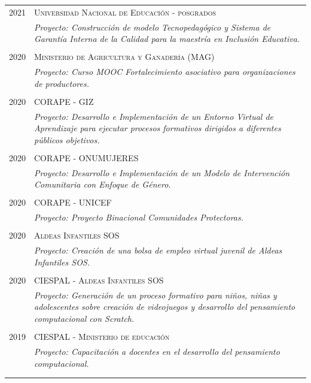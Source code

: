 \documentclass[a4paper]{article}
\begin{document}
\begin{longtable}{r|p{12cm}}
\textsc{2021} &  \textsc{Universidad Nacional de Educación - posgrados} \\&\emph{Proyecto: Construcción de modelo Tecnopedagógico y Sistema de Garantía Interna de la Calidad para la maestría en Inclusión Educativa.}\\\multicolumn{2}{c}{} \\

\textsc{2020} &  \textsc{Ministerio de Agricultura y Ganadería (MAG)} \\&\emph{Proyecto: Curso MOOC Fortalecimiento asociativo para organizaciones de productores.}\\\multicolumn{2}{c}{} \\

\textsc{2020} &  \textsc{CORAPE - GIZ}\\&\emph{Proyecto: Desarrollo e Implementación de un Entorno Virtual de Aprendizaje para ejecutar procesos formativos dirigidos a diferentes públicos objetivos.}\\\multicolumn{2}{c}{} \\

\textsc{2020} &  \textsc{CORAPE - ONUMUJERES}\\&\emph{Proyecto: Desarrollo e Implementación de un Modelo de Intervención Comunitaria con Enfoque de Género.}\\\multicolumn{2}{c}{} \\

\textsc{2020} &  \textsc{CORAPE - UNICEF}\\&\emph{Proyecto: Proyecto Binacional Comunidades Protectoras.}\\\multicolumn{2}{c}{} \\

\textsc{2020} &  \textsc{Aldeas Infantiles SOS} \\&\emph{Proyecto: Creación de una bolsa de empleo virtual juvenil de Aldeas Infantiles SOS.}\\\multicolumn{2}{c}{} \\

\textsc{2020} &  \textsc{CIESPAL - Aldeas Infantiles SOS} \\&\emph{Proyecto: Generación de un proceso formativo para niños, niñas y adolescentes sobre creación de videojuegos y desarrollo del pensamiento computacional con Scratch.}\\\multicolumn{2}{c}{} \\

\textsc{2019} &  \textsc{CIESPAL - Ministerio de educación} \\&\emph{Proyecto: Capacitación a docentes en el desarrollo del pensamiento computacional.}\\\multicolumn{2}{c}{} \\

\end{longtable}
\end{document}
